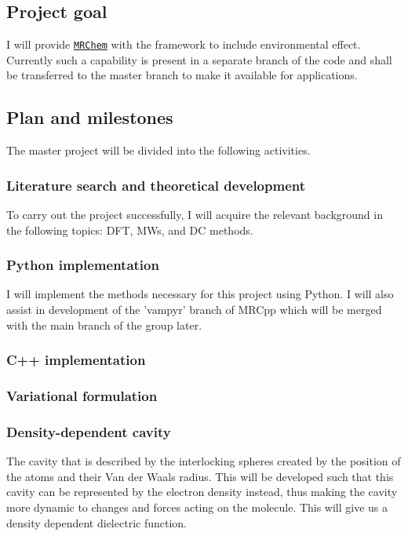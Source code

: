 \documentclass[a4paper,11pt]{article}
\newcommand{\mrchem}{\href{https://mrchem.readthedocs.io/en/latest/}{\texttt{MRChem}}}
\begin{document}
\subsection{Project goal}

I will provide \mrchem{} with the
framework to include environmental effect. Currently such a capability
is present in a separate branch of the code and shall be transferred
to the master branch to make it available for applications.

\subsection{Plan and milestones}

The master project will be divided into the following activities.

\subsubsection{Literature search and theoretical development}

To carry out the project successfully, I will acquire the relevant
background in the following topics: \acl{DFT}, \aclp{MW}, and \acl{DC}
methods.

\subsubsection{Python implementation}

I will implement the methods necessary for this project using Python. I will also assist in development of the 'vampyr' branch of MRCpp which will be merged with the main branch of the group later.

\subsubsection{C++ implementation}

\subsubsection{Variational formulation}

\subsubsection{Density-dependent cavity}

The cavity that is described by the interlocking spheres created by the position of the atoms and their Van der Waals radius. This will be developed such that this cavity can be represented by the electron density instead, thus making the cavity more dynamic to changes and forces acting on the molecule. This will give us a density dependent dielectric function.
\end{document}
